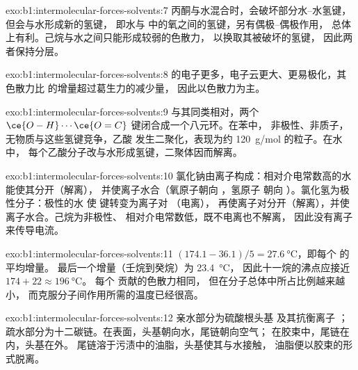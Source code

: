 \begin{solution}{exo:b1:intermolecular-forces-solvents:7}
丙酮与水混合时，会破坏部分水–水氢键，但会与水形成新的氢键，
即水与  中的氧之间的氢键，另有偶极–偶极作用，
总体上有利。己烷与水之间只能形成较弱的色散力，
以换取其被破坏的氢键，
因此两者保持分层。
\end{solution}

\begin{solution}{exo:b1:intermolecular-forces-solvents:8}
 的电子更多，电子云更大、更易极化，其
色散力比  的增量超过葛生力的减少量，
因此以色散力为主。
\end{solution}

\begin{solution}{exo:b1:intermolecular-forces-solvents:9}
 与其同类相对，两个
$\ce{O-H}\cdots\ce{O=C}$ 键闭合成一个八元环。在苯中，
非极性、非质子，无物质与这些氢键竞争，乙酸
发生二聚化，表现为约 \qty{120}{g/mol} 的粒子。在水中，
每个乙酸分子改与水形成氢键，二聚体因而解离。
\end{solution}

\begin{solution}{exo:b1:intermolecular-forces-solvents:10}
氯化钠由离子构成：相对介电常数高的水能使其分开（解离），
并使离子水合（氧原子朝向 ，氢原子
朝向 ）。氯化氢为极性分子：极性的水
使  键转变为离子对 （电离），
再使离子对分开（解离），并使离子水合。己烷为非极性、
相对介电常数低，既不电离也不解离，
因此没有离子来传导电流。
\end{solution}

\begin{solution}{exo:b1:intermolecular-forces-solvents:11}
$(174.1 - 36.1)/5 = \qty{27.6}{\celsius}$，即每个  的平均增量。
最后一个增量（壬烷到癸烷）为 \qty{23.4}{\celsius}，
因此十一烷的沸点应接近 $174 + 22 \approx \qty{196}{\celsius}$。
每个  贡献的色散力相同，
但在分子总体中所占比例越来越小，
而克服分子间作用所需的温度已经很高。
\end{solution}

\begin{solution}{exo:b1:intermolecular-forces-solvents:12}
亲水部分为硫酸根头基  及其抗衡离子 ；
疏水部分为十二碳链。在表面，头基朝向水，尾链朝向空气；
在胶束中，尾链在内，头基在外。
尾链溶于污渍中的油脂，头基使其与水接触，
油脂便以胶束的形式脱离。
\end{solution}

